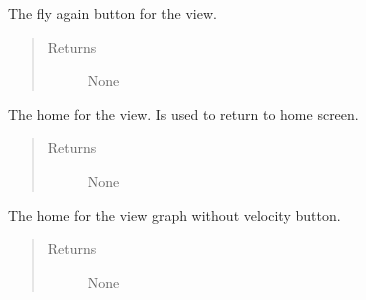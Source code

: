 \documentclass[letterpaper,10pt,english]{sphinxmanual}
\begin{document}
\begin{fulllineitems}
\begin{fulllineitems}
\begin{quote}
\begin{description}
\end{description}\end{quote}

\end{fulllineitems}


\begin{fulllineitems}
\label{\detokenize{index:src.Views.View_ReportScreen.ReportWindow.set_BtnFlyAgain}}
The fly again button for the view.
\begin{quote}\begin{description}
\item[{Returns}] \leavevmode
None

\end{description}\end{quote}

\end{fulllineitems}


\begin{fulllineitems}
\label{\detokenize{index:src.Views.View_ReportScreen.ReportWindow.set_BtnHome}}
The home for the view. Is used to return to home screen.
\begin{quote}\begin{description}
\item[{Returns}] \leavevmode
None

\end{description}\end{quote}

\end{fulllineitems}


\begin{fulllineitems}
\label{\detokenize{index:src.Views.View_ReportScreen.ReportWindow.set_BtnViewGraphNoVelocity}}
The home for the view graph without velocity button.
\begin{quote}\begin{description}
\item[{Returns}] \leavevmode
None


\end{description}
\end{quote}
\end{fulllineitems}
\end{fulllineitems}
\end{document}
